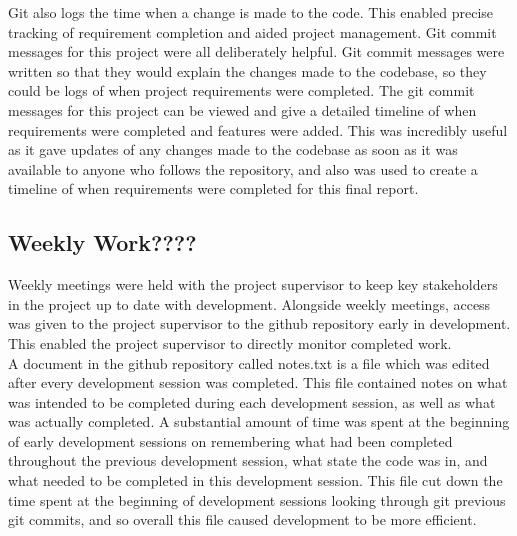 \documentclass{article}
\begin{document}
Git also logs the time when a change is made to the code. This enabled precise tracking of requirement completion and aided project management. Git commit messages for this project were all deliberately helpful. Git commit messages were written so that they would explain the changes made to the codebase, so they could be logs of when project requirements were completed. The git commit messages for this project can be viewed and give a detailed timeline of when requirements were completed and features were added. This was incredibly useful as it gave updates of any changes made to the codebase as soon as it was available to anyone who follows the repository, and also was used to create a timeline of when requirements were completed for this final report. \\

\subsection{Weekly Work????}

Weekly meetings were held with the project supervisor to keep key stakeholders in the project up to date with development. Alongside weekly meetings, access was given to the project supervisor to the  github repository early in development. This enabled the project supervisor to directly monitor completed work. \\

A document in the github repository called notes.txt is a file which was edited after every development session was completed. This file contained notes on what was intended to be completed during each development session, as well as what was actually completed. A substantial amount of time was spent at the beginning of early development sessions on remembering what had been completed throughout the previous development session, what state the code was in, and what needed to be completed in this development session. This file cut down the time spent at the beginning of development sessions looking through git previous git commits, and so overall this file caused development to be more efficient. \\

\end{document}
